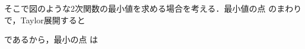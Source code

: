 \documentclass{article}
\begin{document}
\begin{maplelatex}\begin{Maple Normal}{
そこで図のような2次関数の最小値を求める場合を考える．最小値の点
のまわりで，Taylor展開すると}\end{Maple Normal}
\end{maplelatex}
\begin{maplelatex}\begin{center}
\begin{Maple Normal}{
}\end{Maple Normal}
\end{center}
\end{maplelatex}
\begin{maplelatex}\begin{Maple Normal}{
であるから，最小の点
は}\end{Maple Normal}
\end{maplelatex}
\end{document}
